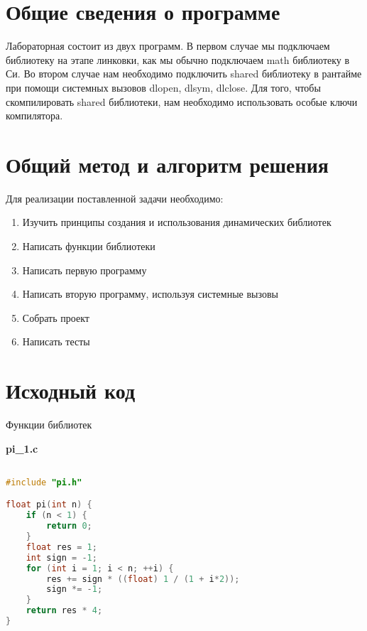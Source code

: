 \section{Общие сведения о программе}

Лабораторная состоит из двух программ. В первом случае мы подключаем библиотеку на этапе линковки, как мы обычно подключаем math библиотеку в Си. Во втором случае нам необходимо подключить shared библиотеку в рантайме при помощи системных вызовов dlopen, dlsym, dlclose. Для того, чтобы скомпилировать shared библиотеки, нам необходимо использовать особые ключи компилятора.

\pagebreak

\section{Общий метод и алгоритм решения}

Для реализации поставленной задачи необходимо:

\begin{enumerate}
    \item Изучить принципы создания и использования динамических библиотек
    \item Написать функции библиотеки
    \item Написать первую программу
    \item Написать вторую программу, используя системные вызовы
    \item Собрать проект
    \item Написать тесты
\end{enumerate}

\pagebreak

\section{Исходный код}

{\large Функции библиотек}

\textbf{pi\_1.c}

\begin{lstlisting}[language=C]

#include "pi.h"

float pi(int n) {
    if (n < 1) {
        return 0;
    }
    float res = 1;
    int sign = -1;
    for (int i = 1; i < n; ++i) {
        res += sign * ((float) 1 / (1 + i*2));
        sign *= -1;
    }
    return res * 4;
}

\end{lstlisting}

